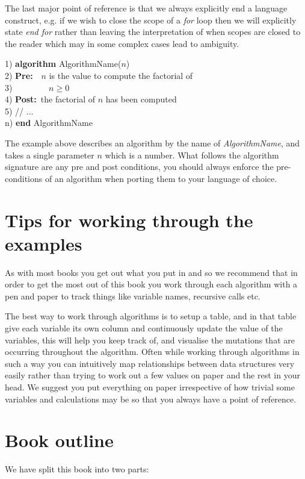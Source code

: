 The last major point of reference is that we always explicitly end a language construct, e.g. if we wish to close the scope of a \textit{for} loop then we will explicitly state \textit{end for} rather than leaving the interpretation of when scopes are closed to the reader which may in some complex cases lead to ambiguity.

\begin{tabbing}
1)  \textbf{alg}\= \textbf{orithm} AlgorithmName($n$) \\
2)  \> \textbf{Pre:}~~$n$ is the value to compute the factorial of \\
3)  \> ~~~~~~~~$n \geq 0$ \\
4)  \> \textbf{Post:}~the factorial of $n$ has been computed \\
5)  \> // ... \\
n) \textbf{end} AlgorithmName \\
\end{tabbing}

The example above describes an algorithm by the name of \textit{AlgorithmName}, and takes a single parameter $n$ which is a number. What follows the algorithm signature are any pre and post conditions, you should always enforce the pre-conditions of an algorithm when porting them to your language of choice.

\section{Tips for working through the examples}
As with most books you get out what you put in and so we recommend that in order to get the most out of this book you work through each algorithm with a pen and paper to track things like variable names, recursive calls etc.

The best way to work through algorithms is to setup a table, and in that table give each variable its own column and continuously update the value of the variables, this will help you keep track of, and visualise the mutations that are occurring throughout the algorithm. Often while working through algorithms in such a way you can intuitively map relationships between data structures very easily rather than trying to work out a few values on paper and the rest in your head. We suggest you put everything on paper irrespective of how trivial some variables and calculations may be so that you always have a point of reference.

\section{Book outline}
We have split this book into two parts:


